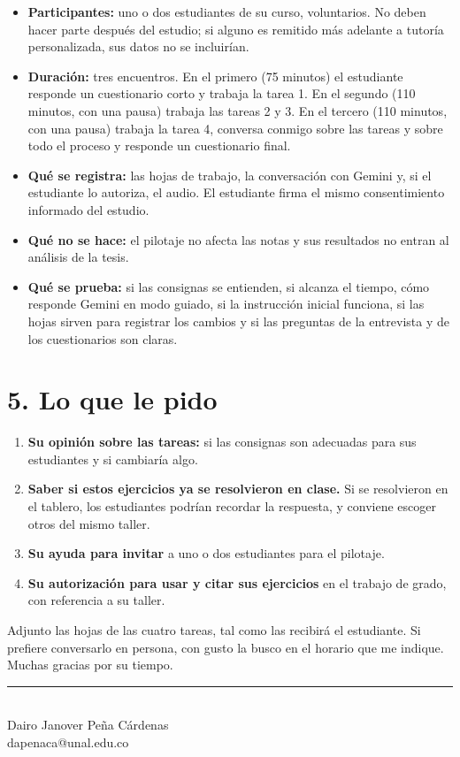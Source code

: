 \documentclass[11pt,letterpaper]{article}
\begin{document}
\begin{itemize}
  \item \textbf{Participantes:} uno o dos estudiantes de su curso, voluntarios. No deben hacer parte después del estudio; si alguno es remitido más adelante a tutoría personalizada, sus datos no se incluirían.
  \item \textbf{Duración:} tres encuentros. En el primero (75 minutos) el estudiante responde un cuestionario corto y trabaja la tarea 1. En el segundo (110 minutos, con una pausa) trabaja las tareas 2 y 3. En el tercero (110 minutos, con una pausa) trabaja la tarea 4, conversa conmigo sobre las tareas y sobre todo el proceso y responde un cuestionario final.
  \item \textbf{Qué se registra:} las hojas de trabajo, la conversación con Gemini y, si el estudiante lo autoriza, el audio. El estudiante firma el mismo consentimiento informado del estudio.
  \item \textbf{Qué no se hace:} el pilotaje no afecta las notas y sus resultados no entran al análisis de la tesis.
  \item \textbf{Qué se prueba:} si las consignas se entienden, si alcanza el tiempo, cómo responde Gemini en modo guiado, si la instrucción inicial funciona, si las hojas sirven para registrar los cambios y si las preguntas de la entrevista y de los cuestionarios son claras.
\end{itemize}

\section*{5. Lo que le pido}

\begin{enumerate}
  \item \textbf{Su opinión sobre las tareas:} si las consignas son adecuadas para sus estudiantes y si cambiaría algo.
  \item \textbf{Saber si estos ejercicios ya se resolvieron en clase.} Si se resolvieron en el tablero, los estudiantes podrían recordar la respuesta, y conviene escoger otros del mismo taller.
  \item \textbf{Su ayuda para invitar} a uno o dos estudiantes para el pilotaje.
  \item \textbf{Su autorización para usar y citar sus ejercicios} en el trabajo de grado, con referencia a su taller.
\end{enumerate}

\vspace{0.5cm}
\noindent Adjunto las hojas de las cuatro tareas, tal como las recibirá el estudiante. Si prefiere conversarlo en persona, con gusto la busco en el horario que me indique. Muchas gracias por su tiempo.

\vspace{0.8cm}
\noindent\rule{6.5cm}{0.4pt}\\
Dairo Janover Peña Cárdenas\\
dapenaca@unal.edu.co
\end{document}
